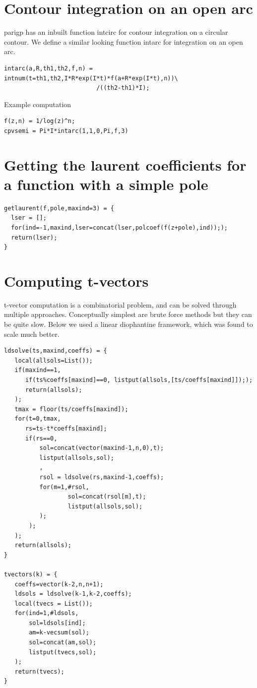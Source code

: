 \documentclass[a4paper,11pt,twoside]{amsart}
\begin{document}
\section{Contour integration on an open arc}
parigp has an inbuilt function intcirc for contour integration on a circular contour. 
We define a similar looking function intarc for integration on an open arc.

\begin{verbatim}
intarc(a,R,th1,th2,f,n) = intnum(t=th1,th2,I*R*exp(I*t)*f(a+R*exp(I*t),n))\
                          /((th2-th1)*I);
\end{verbatim}

Example computation
\begin{verbatim}
f(z,n) = 1/log(z)^n;
cpvsemi = Pi*I*intarc(1,1,0,Pi,f,3)
\end{verbatim}

\section{Getting the laurent coefficients for a function with a simple pole}
\begin{verbatim}
getlaurent(f,pole,maxind=3) = {
  lser = [];
  for(ind=-1,maxind,lser=concat(lser,polcoef(f(z+pole),ind)););
  return(lser);
}
\end{verbatim}

\section{Computing t-vectors}
t-vector computation is a combinatorial problem, and can be solved through multiple approaches. Conceptually simplest are brute force methods but they can be quite slow. Below we used a linear diophantine framework, which was found to scale much better.

\begin{verbatim}
ldsolve(ts,maxind,coeffs) = {
   local(allsols=List()); 
   if(maxind==1, 
      if(ts%coeffs[maxind]==0, listput(allsols,[ts/coeffs[maxind]]););    
      return(allsols);
   ); 
   tmax = floor(ts/coeffs[maxind]);
   for(t=0,tmax,
      rs=ts-t*coeffs[maxind];
      if(rs==0,
          sol=concat(vector(maxind-1,n,0),t);
          listput(allsols,sol);
          ,
          rsol = ldsolve(rs,maxind-1,coeffs); 
          for(m=1,#rsol,
                  sol=concat(rsol[m],t);
                  listput(allsols,sol);
          );
       );
   );
   return(allsols);
}

tvectors(k) = {
   coeffs=vector(k-2,n,n+1);
   ldsols = ldsolve(k-1,k-2,coeffs);
   local(tvecs = List());
   for(ind=1,#ldsols,
       sol=ldsols[ind];
       am=k-vecsum(sol);
       sol=concat(am,sol);
       listput(tvecs,sol);
   );
   return(tvecs);
}
\end{verbatim}
\end{document}
